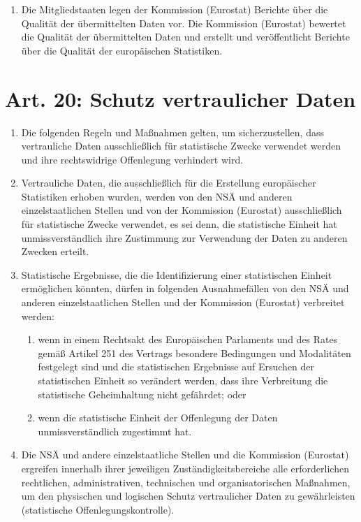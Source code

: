 \documentclass[12pt]{scrbook}
\begin{document}
\begin{enumerate}[label=(\arabic*)]
            \item Die Mitgliedstaaten legen der Kommission (Eurostat) Berichte über die Qualität der übermittelten Daten vor. Die Kommission (Eurostat) bewertet die Qualität der übermittelten Daten und erstellt und veröffentlicht Berichte über die Qualität der europäischen Statistiken.
        \end{enumerate}
    \section{Art. 20: Schutz vertraulicher Daten}
        \begin{enumerate}[label=(\arabic*)]
            \item Die folgenden Regeln und Maßnahmen gelten, um sicherzustellen, dass vertrauliche Daten ausschließlich für statistische Zwecke verwendet werden und ihre rechtswidrige Offenlegung verhindert wird.
            \item Vertrauliche Daten, die ausschließlich für die Erstellung europäischer Statistiken erhoben wurden, werden von den NSÄ und anderen einzelstaatlichen Stellen und von der Kommission (Eurostat) ausschließlich für statistische Zwecke verwendet, es sei denn, die statistische Einheit hat unmissverständlich ihre Zustimmung zur Verwendung der Daten zu anderen Zwecken erteilt.
            \item Statistische Ergebnisse, die die Identifizierung einer statistischen Einheit ermöglichen könnten, dürfen in folgenden Ausnahmefällen von den NSÄ und anderen einzelstaatlichen Stellen und der Kommission (Eurostat) verbreitet werden:
            \begin{enumerate}
                \item wenn in einem Rechtsakt des Europäischen Parlaments und des Rates gemäß Artikel 251 des Vertrags besondere Bedingungen und Modalitäten festgelegt sind und die statistischen Ergebnisse auf Ersuchen der statistischen Einheit so verändert werden, dass ihre Verbreitung die statistische Geheimhaltung nicht gefährdet; oder
                \item wenn die statistische Einheit der Offenlegung der Daten unmissverständlich zugestimmt hat.
            \end{enumerate}
            \item Die NSÄ und andere einzelstaatliche Stellen und die Kommission (Eurostat) ergreifen innerhalb ihrer jeweiligen Zuständigkeitsbereiche alle erforderlichen rechtlichen, administrativen, technischen und organisatorischen Maßnahmen, um den physischen und logischen Schutz vertraulicher Daten zu gewährleisten (statistische Offenlegungskontrolle).

\end{enumerate}
\end{document}
